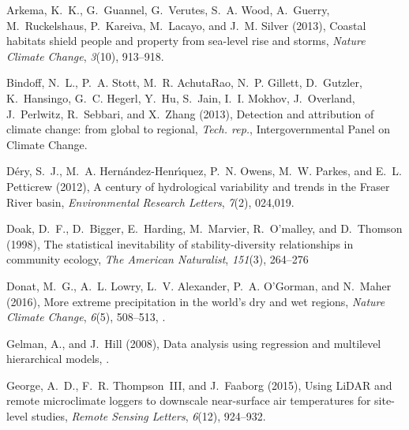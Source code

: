 \documentclass[9pt,twocolumn,twoside,lineno]{pnas-new}
\begin{document}
{{%


Arkema, K.~K., G.~Guannel, G.~Verutes, S.~A. Wood, A.~Guerry, M.~Ruckelshaus,
  P.~Kareiva, M.~Lacayo, and J.~M. Silver (2013), Coastal habitats shield
  people and property from sea-level rise and storms, \textit{Nature Climate
  Change}, \textit{3}(10), 913--918.

Bindoff, N.~L., P.~A. Stott, M.~R. AchutaRao, N.~P. Gillett, D.~Gutzler,
  K.~Hansingo, G.~C. Hegerl, Y.~Hu, S.~Jain, I.~I. Mokhov, J.~Overland,
  J.~Perlwitz, R.~Sebbari, and X.~Zhang (2013), Detection and attribution of
  climate change: from global to regional, \textit{Tech. rep.},
  Intergovernmental Panel on Climate Change.

D{\'e}ry, S.~J., M.~A. Hern{\'a}ndez-Henr{\'\i}quez, P.~N. Owens, M.~W. Parkes,
  and E.~L. Petticrew (2012), A century of hydrological variability and trends
  in the {F}raser {R}iver basin, \textit{Environmental Research Letters},
  \textit{7}(2), 024,019.

Doak, D.~F., D.~Bigger, E.~Harding, M.~Marvier, R.~O'malley, and D.~Thomson
  (1998), The statistical inevitability of stability-diversity relationships in
  community ecology, \textit{The American Naturalist}, \textit{151}(3),
  264--276 %

Donat, M.~G., A.~L. Lowry, L.~V. Alexander, P.~A. O'Gorman, and N.~Maher
  (2016), More extreme precipitation in the world's dry and wet regions,
  \textit{Nature Climate Change}, \textit{6}(5), 508--513,
  .

Gelman, A., and J.~Hill (2008), Data analysis using regression and multilevel
  hierarchical models, .

George, A.~D., F.~R. Thompson~III, and J.~Faaborg (2015), Using {L}i{DAR} and
  remote microclimate loggers to downscale near-surface air temperatures for
  site-level studies, \textit{Remote Sensing Letters}, \textit{6}(12),
  924--932.

}}
\end{document}
